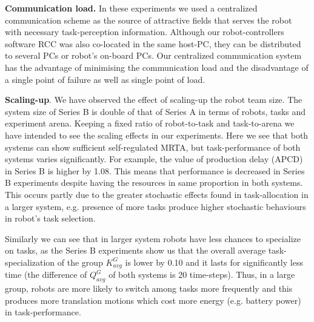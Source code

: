 \documentclass[smallcondensed]{svjour3}
\begin{document}
\textbf{Communication load.} In these experiments we used a centralized communication scheme as the source of attractive fields that serves the robot with necessary task-perception information. Although our robot-controllers software RCC was also co-located in the same host-PC, they can be distributed to several PCs or robot's on-board PCs. Our centralized communication system has the advantage of minimising the communication load and the disadvantage of a single point of failure as well as single point of load. 

\textbf{Scaling-up}. We have observed the effect of scaling-up the robot team size. The system size of Series B is double of that of Series A in terms of robots, tasks and experiment arena. Keeping a fixed ratio of robot-to-task and task-to-arena we have intended to see the scaling effects in our experiments. Here we see that both systems can show sufficient self-regulated MRTA, but task-performance of both systems varies significantly. For example, the value of production delay (APCD) in Series B is higher by 1.08. This means that performance  is decreased in Series B experiments despite having the resources in same proportion in both systems. This occurs partly due to the greater stochastic effects found in task-allocation in a larger system, e.g. presence of more tasks produce higher stochastic behaviours in robot's task selection.

Similarly we can see that in larger system robots have less chances to specialize on tasks, as the Series B experiments show us that the overall average task-specialization of the group $K^G_{avg}$ is lower by 0.10 and it lasts for significantly less time (the difference of $Q^G_{avg}$  of both systems is 20 time-steps). Thus, in a large group, robots are more likely to switch among tasks more frequently and this produces more translation motions which cost more energy (e.g. battery power) in task-performance.
\end{document}
